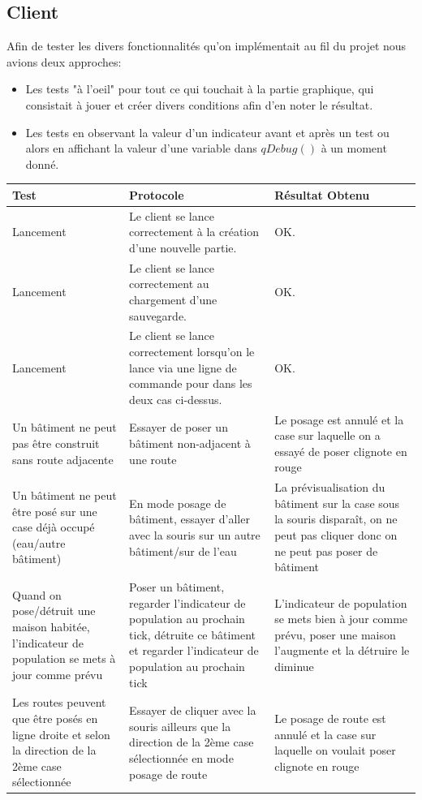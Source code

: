\documentclass[a4paper,10pt,openany,oneside]{report}
\begin{document}
\subsection{Client}
Afin de tester les divers fonctionnalités qu'on implémentait au fil du projet nous avions deux approches:
\begin{itemize}
\item Les tests "à l'oeil" pour tout ce qui touchait à la partie graphique, qui consistait à jouer et créer divers conditions afin d'en noter le résultat.
\
\item Les tests en observant la  valeur d'un indicateur avant et après un test ou alors en affichant la valeur d'une variable dans $qDebug()$ à un moment donné.

\end{itemize}
\begin{center}
	\begin{longtable}{| p{} | p{} | p{} |}
	\hline
		 \textbf{Test} & \textbf{Protocole} & \textbf{Résultat Obtenu}
\\ \hline Lancement & Le client se lance correctement à la création d'une nouvelle partie. & OK.
\\ \hline Lancement & Le client se lance correctement au chargement d'une sauvegarde. & OK.
\\ \hline Lancement & Le client se lance correctement lorsqu'on le lance via une ligne de commande pour dans les deux cas ci-dessus. & OK.
		 \\ \hline Un bâtiment ne peut pas être construit sans route adjacente & Essayer de poser un bâtiment non-adjacent à une route & Le posage est annulé et la case sur laquelle on a essayé de poser clignote en rouge
		\\ \hline Un bâtiment ne peut être posé sur une case déjà occupé (eau/autre bâtiment) & En mode posage de bâtiment, essayer d'aller avec la souris sur un autre bâtiment/sur de l'eau & La prévisualisation du bâtiment sur la case sous la souris disparaît, on ne peut pas cliquer donc on ne peut pas poser de bâtiment
		\\ \hline Quand on pose/détruit une maison habitée, l'indicateur de population se mets à jour comme prévu & Poser un bâtiment, regarder l'indicateur de population au prochain tick, détruite ce bâtiment et regarder l'indicateur de population au prochain tick & L'indicateur de population se mets bien à jour comme prévu, poser une maison l'augmente et la détruire le diminue
		\\ \hline Les routes peuvent que être posés en ligne droite et selon la direction de la 2ème case sélectionnée & Essayer de cliquer avec la souris ailleurs que la direction de la 2ème case sélectionnée en mode posage de route & Le posage de route est annulé et la case sur laquelle on voulait poser clignote en rouge

\end{longtable}
\end{center}
\end{document}
